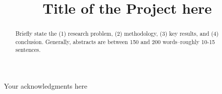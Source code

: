 \documentclass{fast-nuces-bs}
\title{Title of the Project here}
\begin{document}
\begin{acknowledgements}
	Your acknowledgments here
\end{acknowledgements}

\begin{abstract}
Briefly state the (1) research problem, (2) methodology, (3) key results, and (4) conclusion. Generally, abstracts are between 150 and 200 words–roughly 10-15 sentences.
\end{abstract}














%



\end{document}
